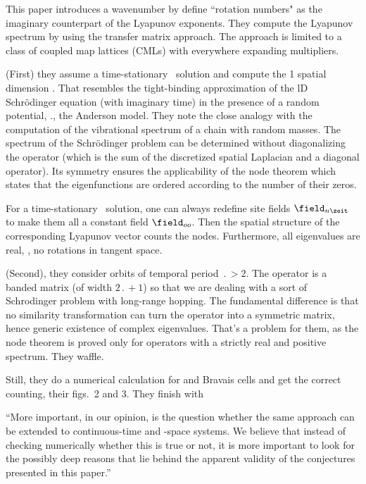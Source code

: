 This paper introduces a wavenumber by define ``rotation numbers" as the
imaginary counterpart of the Lyapunov exponents. They compute the
Lyapunov spectrum by using the transfer matrix approach. The approach is
limited to a class of coupled map lattices (CMLs) with everywhere
expanding multipliers.

(First) they assume a time-stationary \spt\ solution and
compute the 1 spatial dimension {\jacobianOrb}. That resembles the
tight-binding approximation of the lD Schr\"odinger equation (with
imaginary time) in the presence of a random potential, \ie., the Anderson
model. They note the close analogy with the computation of the
vibrational spectrum of a chain with random masses.
The spectrum of the Schr\"odinger problem can be determined without
diagonalizing the operator (which is the sum of the discretized spatial
Laplacian and a diagonal operator). Its symmetry ensures the
applicability of the node theorem which states that the eigenfunctions
are ordered according to the number of their zeros.

For a time-stationary \spt\ solution, one can always redefine site fields
$\field_{n\zeit}$ to make them all a constant field $\field_{oo}$. Then
the spatial structure of the corresponding Lyapunov vector counts the
nodes. Furthermore, all eigenvalues are real, \ie, no rotations in
tangent space.

(Second), they consider orbits of temporal period $\period{}>2$. The
operator is a banded matrix (of width $2\period{} + 1$) so that we are
dealing with a sort of Schrodinger problem with long-range hopping. The
fundamental difference is that no similarity transformation can turn the
operator into a symmetric matrix, hence generic existence of complex
eigenvalues. That's a problem for them, as the node theorem is proved
only for operators with a strictly real and positive spectrum. They waffle.

Still, they do a numerical calculation for  and
 Bravais cells and get the correct counting, their figs.~2
and 3. They finish with

``More important, in our opinion, is the question whether the same
approach can be extended to continuous-time and -space systems. We
believe that instead of checking numerically whether this is true or not,
it is more important to look for the possibly deep reasons that lie
behind the apparent validity of the conjectures presented in this
paper.''

\begin{description}


\end{description}

